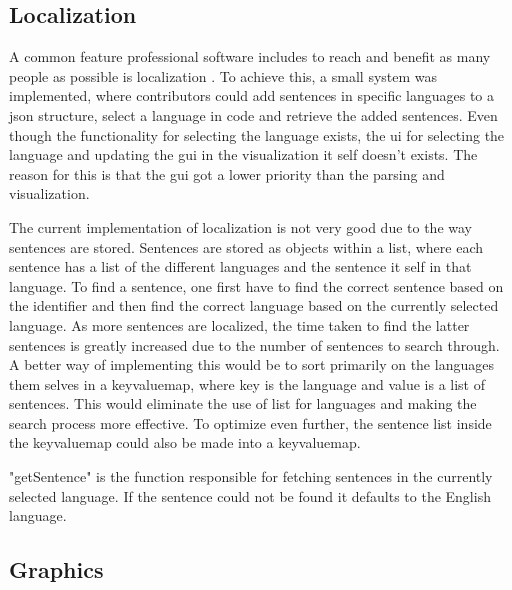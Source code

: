 \subsection{Localization}



A common feature professional software includes to reach and benefit as many people as possible is \gls{localization} \cite{souphavanh2005localization}. To achieve this, a small system was implemented, where contributors could add sentences in specific languages to a \gls{json} structure, select a language in code and retrieve the added sentences. Even though the functionality for selecting the language exists, the \gls{ui} for selecting the language and updating the \gls{gui} in the visualization it self doesn't exists. The reason for this is that the \gls{gui} got a lower priority than the parsing and visualization. 

The current implementation of \gls{localization} is not very good due to the way sentences are stored. Sentences are stored as objects within a list, where each sentence has a list of the different languages and the sentence it self in that language. To find a sentence, one first have to find the correct sentence based on the identifier and then find the correct language based on the currently selected language. As more sentences are localized, the time taken to find the latter sentences is greatly increased due to the number of sentences to search through. A better way of implementing this would be to sort primarily on the languages them selves in a \gls{keyvaluemap}, where key is the language and value is a list of sentences. This would eliminate the use of list for languages and making the search process more effective. To optimize even further, the sentence list inside the \gls{keyvaluemap} could also be made into a \gls{keyvaluemap}. 

"getSentence" is the function responsible for fetching sentences in the currently selected language. If the sentence could not be found it defaults to the English language. 

\subsection{Graphics}
\label{subsection:graphicsFunctionLinking}

